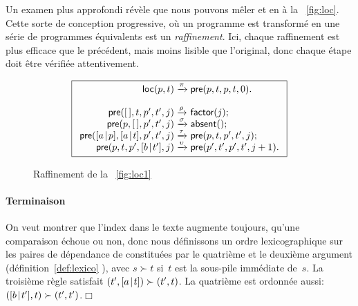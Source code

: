 Un examen plus approfondi révèle que nous pouvons mêler
 et
 en
 à la \fig~\vref{fig:loc}. Cette sorte de
conception progressive, où un programme est transformé en une série de
programmes équivalents est un \emph{raffinement}. Ici, chaque
raffinement est plus efficace que le précédent, mais moins lisible que
l'original, donc chaque étape doit être vérifiée attentivement.
\begin{figure}[h]
\begin{equation*}
\boxed{%
\begin{array}{r@{\;}l@{\;}l}
\fun{loc}(p,t)   & \xrightarrow{\smash{\pi}} & \fun{pre}(p,t,p,t,0).\\
\\
\fun{pre}(\el,t,p',t',j) & \xrightarrow{\smash{\rho}}
                         & \fun{factor}(j);\\
\fun{pre}(p,\el,p',t',j) & \xrightarrow{\smash{\sigma}}
                         & \fun{absent}();\\
\fun{pre}(\cons{a}{p},\cons{a}{t},p',t',j)
                         & \xrightarrow{\smash{\tau}}
                         & \fun{pre}(p,t,p',t',j);\\
\fun{pre}(p,t,p',\cons{b}{t'},j) & \xrightarrow{\smash{\upsilon}}
                         & \fun{pre}(p',t',p',t',j+1).
\end{array}}
\end{equation*}
\caption{Raffinement de la \fig~\vref{fig:loc1}}
\label{fig:loc}
\end{figure}

\paragraph{Terminaison}

On veut montrer que l'index dans le texte augmente toujours, qu'une
comparaison échoue ou non, donc nous définissons un ordre
lexicographique sur les paires de dépendance de 
 constituées par le quatrième
et le deuxième argument (définition~\eqref{def:lexico}
), avec \(s \succ t\) si~\(t\) est la sous-pile
immédiate de~\(s\). La troisième règle satisfait \((t',[{a}\!\mid\!{t}])
\succ (t',t)\). La quatrième est ordonnée aussi: \(([{b}\!\mid\!{t'}],t)
\succ (t',t')\).\hfill\(\Box\)

